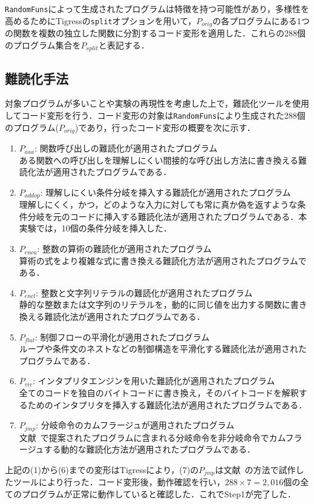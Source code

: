 \documentclass[12pt]{jarticle}
\begin{document}
\texttt{RandomFuns}によって生成されたプログラムは特徴を持つ可能性があり，多様性を高めるためにTigressの\texttt{split}オプションを用いて，$P_{orig}$の各プログラムにある1つの関数を複数の独立した関数に分割するコード変形を適用した．これらの288個のプログラム集合を$P_{split}$と表記する．

\subsection{難読化手法}
対象プログラムが多いことや実験の再現性を考慮した上で，難読化ツールを使用してコード変形を行う．コード変形の対象は\texttt{RandomFuns}により生成された288個のプログラム($P_{orig}$)であり，行ったコード変形の概要を次に示す．

\begin{enumerate}[leftmargin=*]
  \item$P_{aaa}$: 関数呼び出しの難読化が適用されたプログラム \\
  ある関数への呼び出しを理解しにくい間接的な呼び出し方法に書き換える難読化法が適用されたプログラムである．
  \item$P_{addop}$: 理解しにくい条件分岐を挿入する難読化が適用されたプログラム \\
  理解しにくく，かつ，どのような入力に対しても常に真か偽を返すような条件分岐を元のコードに挿入する難読化法が適用されたプログラムである．本実験では，10個の条件分岐を挿入した．
  \item$P_{enca}$: 整数の算術の難読化が適用されたプログラム \\
  算術の式をより複雑な式に書き換える難読化方法が適用されたプログラムである．
  \item$P_{encl}$: 整数と文字列リテラルの難読化が適用されたプログラム \\
  静的な整数または文字列のリテラルを，動的に同じ値を出力する関数に書き換える難読化法が適用されたプログラムである．
  \item$P_{flat}$: 制御フローの平滑化が適用されたプログラム \\
  ループや条件文のネストなどの制御構造を平滑化する難読化法が適用されたプログラムである．
  \item$P_{vir}$: インタプリタエンジンを用いた難読化が適用されたプログラム \\
  全てのコードを独自のバイトコードに書き換え，そのバイトコードを解釈するためのインタプリタを挿入する難読化法が適用されたプログラムである．
  \item$P_{jmp}$: 分岐命令のカムフラージュが適用されたプログラム \\
  文献~\cite{jmp-obf}で提案されたプログラムに含まれる分岐命令を非分岐命令でカムフラージュする動的な難読化方法が適用されたプログラムである．
\end{enumerate}
上記の(1)から(6)までの変形はTigressにより，(7)の$P_{jmp}$は文献~\cite{jmp-obf}の方法で試作したツールにより行った．コード変形後，動作確認を行い，$288\times7=2,016$個の全てのプログラムが正常に動作していると確認した．これでStep1が完了した．
\end{document}
